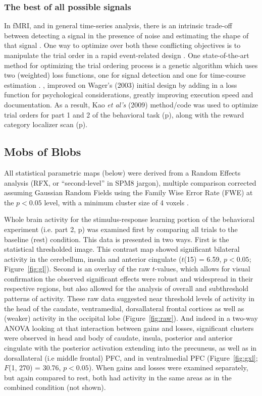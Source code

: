 \documentclass[doc,12pt]{apa}        %
\begin{document}
\subsubsection{The best of all possible signals}
\label{subsub:bestsignal}
In fMRI, and in general time-series analysis, there is an intrinsic trade-off between detecting a signal in the presence of noise and estimating the shape of that signal \cite{Dale:1999p7901,Birn:2002p1777,Liu:2004p2141}.   One way to optimize over both these conflicting objectives is to manipulate the trial order in a rapid event-related design \cite{Miezin:2000p7924}.  One state-of-the-art method for optimizing the trial ordering process is a genetic algorithm which uses two (weighted) loss functions, one for signal detection and one for time-course estimation \cite{Wager:2003p2980}. , improved on Wager's (2003) initial design by adding in a loss function for psychological considerations, greatly improving execution speed and documentation.  As a result, Kao \emph{et al's} (2009) method/code was used to optimize trial orders for part 1 and 2 of the behavioral task (p\pageref{subsub:whatwhen}), along with the reward category localizer scan (p\pageref{subsub:datadetails}).

\subsection{Mobs of Blobs}
\label{sub:blob}
All statistical parametric maps (below) were derived from a Random Effects analysis (RFX, or ``second-level'' in SPM8 jargon), multiple comparison corrected assuming Gaussian Random Fields using the Family Wise Error Rate (FWE) at the $p < 0.05$ level, with a minimum cluster size of 4 voxels \cite{Worsley:1996p9367}. 

Whole brain activity for the stimulus-response learning portion of the behavioral experiment (i.e. part 2, p\pageref{subsub:whatwhen}) was examined first by comparing all trials to the baseline (rest) condition.  This data is presented in two ways. First is the statistical thresholded image.  This contrast map showed significant bilateral activity in the cerebellum, insula and anterior cingulate ($t$(15) = 6.59, $p< 0.05$; Figure~\ref{fig:gl}).  Second is an overlay of the raw $t$-values, which allows for visual confirmation the observed significant effects were robust and widespread in their respective regions, but also allowed for the analysis of overall and subthreshold patterns of activity.  These raw data suggested near threshold levels of activity in the head of the caudate, ventramedial, dorsallateral frontal cortices as well as (weaker) activity in the occipital lobe (Figure~\ref{fig:raw}).  And indeed in a two-way ANOVA looking at that interaction between gains and losses, significant clusters were observed in head and body of caudate, insula, posterior and anterior cingulate with the posterior activation extending into the precuneus, as well as in dorsallateral (i.e middle frontal) PFC, and in ventralmedial PFC (Figure~\ref{fig:gxl}; $F$(1, 270) = 30.76, $p < 0.05$).  When gains and losses were examined separately, but again compared to rest, both had activity in the same areas as in the combined condition (not shown).
\end{document}
